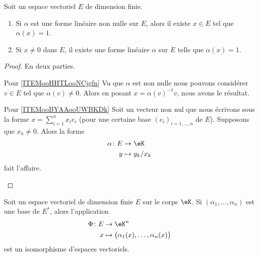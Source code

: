 \begin{lemma}       \label{LEMooQLWNooYUpGdo}
    Soit un espace vectoriel \( E\) de dimension finie.
    \begin{enumerate}
        \item       \label{ITEMooHHTLooNCjgfn}
            Si \( \alpha\) est une forme linéaire non nulle sur \( E\), alors il existe \( x\in E\) tel que \( \alpha(x)=1\).
        \item       \label{ITEMooBYAAooUWBKDk}
            Si \( x\neq 0\) dans \( E\), il existe une forme linéaire \( \alpha\) sur \( E\) telle que \( \alpha(x)=1\).
    \end{enumerate}
\end{lemma}

\begin{proof}
    En deux parties.
    \begin{subproof}
    \item[Pour \ref{ITEMooHHTLooNCjgfn}]
        Vu que \( \alpha\) est non nulle nous pouvons considérer \( v\in E\) tel que \( \alpha(v)\neq 0\). Alors en posant \( x=\alpha(v)^{-1}  v\), nous avons le résultat.
    \item[Pour \ref{ITEMooBYAAooUWBKDk}]
        Soit un vecteur non nul que nous écrivons sous la forme \( x=\sum_{i=1}^nx_ie_i\) (pour une certaine base \( (e_i)_{i=1,\ldots, n}\) de \( E\)). Supposons que \( x_k\neq 0\). Alors la forme
        \begin{equation}
            \begin{aligned}
                \alpha\colon E&\to \eK \\
                y&\mapsto y_k/x_k 
            \end{aligned}
        \end{equation}
        fait l'affaire.
    \end{subproof}
\end{proof}

\begin{lemma}       \label{LEMooKTREooBrnWVz}
    Soit un espace vectoriel de dimension finie \( E\) sur le corps \( \eK\). Si \( (\alpha_1,\ldots,  \alpha_n)\) est une base de \( E^*\), alors l'application
    \begin{equation}
        \begin{aligned}
            \Phi\colon E&\to \eK^n \\
            x&\mapsto \big( \alpha_1(x),\ldots, \alpha_n(x) \big) 
        \end{aligned}
    \end{equation}
    est un isomorphisme d'espaces vectoriels. 

\end{lemma}

